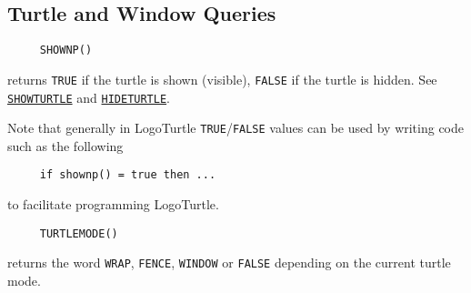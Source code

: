 

\subsection{Turtle and Window Queries}

\begin{verbatim}
     SHOWNP()
\end{verbatim}
returns \texttt{TRUE} if the turtle is shown (visible), \texttt{FALSE}
if the turtle is hidden.  See
\hyperref[logoturtle:showturtle]{\texttt{SHOWTURTLE}} and
\hyperref[logoturtle:hideturtle]{\texttt{HIDETURTLE}}.

Note that generally in LogoTurtle \texttt{TRUE}/\texttt{FALSE} values
can be used by writing code such as the following
\begin{verbatim}
     if shownp() = true then ...
\end{verbatim}
to facilitate programming LogoTurtle.

\begin{verbatim}
     TURTLEMODE()
\end{verbatim}
returns the word \texttt{WRAP}, \texttt{FENCE}, \texttt{WINDOW} or
\texttt{FALSE} depending on the current turtle mode.



